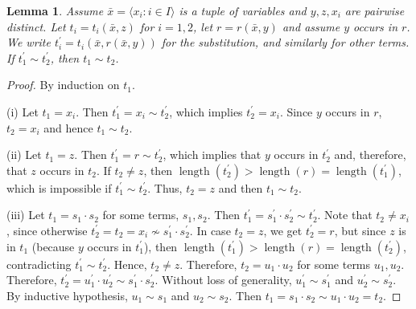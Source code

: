 \documentclass[10pt,a4paper]{article}
\DeclareMathOperator{\len}{length}
\theoremstyle{note}
\newtheorem{lemma}[thm]{Lemma}
\begin{document}
\begin{lemma}\label{March_8_23_1} Assume $\bar{x}= \langle x_i : i \in I\rangle$ is a tuple of variables and  $y,z,x_i$ are pairwise distinct. Let  $t_i=t_i(\bar{x},z)$  for $i=1,2$, let $r=r(\bar{x},y)$  and assume $y$ occurs in $r$. We write  $t_i^\prime= t_i(\bar{x},r(\bar{x},y))$  for the substitution, and similarly for other terms.  If  $t_1^\prime\sim t_2^\prime$, then  $t_1\sim t_2$.
\end{lemma}
\begin{proof} By induction on $t_1$.

(i) Let $t_1= x_i$.  Then  $t_1^\prime= x_i\sim t_2^\prime$, which implies $t_2^\prime= x_i$. Since  $y$ occurs in $r$,  $t_2= x_i$ and hence $t_1\sim t_2$.

(ii) Let  $t_1= z$.  Then $t_1^\prime = r\sim t_2^\prime$, which implies that $y$ occurs in $t_2^\prime$ and, therefore, that $z$ occurs in $t_2$.  If $t_2\neq z$, then $\len(t_2^\prime)>\len(r)=\len(t_1^\prime)$, which is impossible if $t_1^\prime\sim t_2^\prime$. Thus, $t_2= z$ and then $t_1\sim t_2$.

(iii) Let  $t_1= s_1\cdot s_2$  for some terms, $s_1,s_2$.  Then $t_1^\prime= s_1^\prime\cdot s_2^\prime\sim t_2^\prime$. Note that $t_2\neq x_i$, since otherwise $t_2^\prime= t_2=x_i\not\sim s_1^\prime\cdot s_2^\prime$. In case $t_2= z$, we get $t_2^\prime=r$, but since $z$ is in  $t_1$ (because $y$ occurs in $t_1^\prime$), then $\len(t_1^\prime)>\len(r)=\len(t_2^\prime)$, contradicting $t_1^\prime\sim t_2^\prime$. Hence, $t_2\neq z$. Therefore, $t_2= u_1\cdot u_2$  for some terms $u_1,u_2$.  Therefore, $t_2^\prime=u_1^\prime\cdot u_2^\prime\sim s_1^\prime\cdot s_2^\prime$. Without loss of generality,  $u_1^\prime\sim s_1^\prime$ and  $u_2^\prime\sim s_2^\prime$. By inductive hypothesis, $u_1\sim s_1$ and $u_2\sim s_2$.  Then $t_1= s_1\cdot s_2\sim u_1\cdot u_2 = t_2$.
\end{proof}
\end{document}
